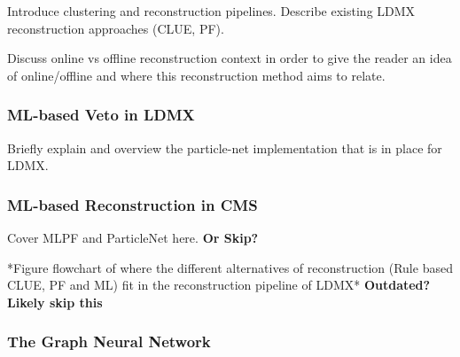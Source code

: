Introduce clustering and reconstruction pipelines. Describe existing LDMX reconstruction approaches (CLUE, PF).

Discuss online vs offline reconstruction context in order to give the reader an idea of online/offline and where this reconstruction method aims to relate.

\subsubsection{ML-based Veto in LDMX}

Briefly explain and overview the particle-net implementation that is in place for LDMX. 



\subsubsection{ML-based Reconstruction in CMS}

Cover MLPF and ParticleNet here. \textbf{Or Skip? }

*Figure flowchart of where the different alternatives of reconstruction (Rule based CLUE, PF and ML) fit in the reconstruction pipeline of LDMX* \textbf{Outdated? Likely skip this}



\subsubsection{The Graph Neural Network}

